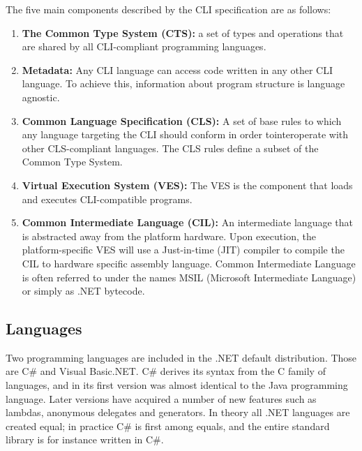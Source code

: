 	The five main components described by the CLI specification are as follows:

	\begin{enumerate}
		
		\item \textbf{The Common Type System (CTS):} a set of types and operations 
		that are shared by all CLI-compliant programming languages.
		
		\item \textbf{Metadata:} Any CLI language can access code written in any 
		other CLI language. To achieve this, information about program structure 
		is language agnostic.
	
		\item \textbf{Common Language Specification (CLS):} A set of base rules to 
		which any language targeting the CLI should conform in order 
		tointeroperate with other CLS-compliant languages. The CLS rules define a 
		subset of the Common Type System.
	
		\item \textbf{Virtual Execution System (VES):} The VES is the component 
		that loads and executes CLI-compatible programs. 
	
		\item \textbf{Common Intermediate Language (CIL):} An intermediate 
		language that is abstracted away from the platform hardware. Upon 
		execution, the platform-specific VES will use a Just-in-time (JIT) 
		compiler to compile the CIL to hardware specific assembly language. Common 
		Intermediate Language is often referred to under the names MSIL (Microsoft 
		Intermediate Language) or simply as .NET bytecode.

	\end{enumerate}
    
\subsection{Languages}
	
	Two programming languages are included in the .NET default distribution. 
	Those are C\# and Visual Basic.NET. C\# derives its syntax from the C family 
	of languages, and in its first version was almost identical to the Java 
	programming language. Later versions have acquired a number of new features 
	such as lambdas, anonymous delegates and generators. In theory all .NET 
	languages are created equal; in practice C\# is first among equals, and the 
	entire standard library is for instance written in C\#. 

